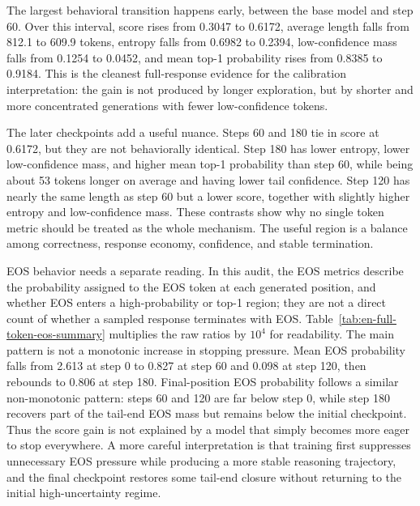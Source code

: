 The largest behavioral transition happens early, between the base model and step 60. Over this interval, score rises from 0.3047 to 0.6172, average length falls from 812.1 to 609.9 tokens, entropy falls from 0.6982 to 0.2394, low-confidence mass falls from 0.1254 to 0.0452, and mean top-1 probability rises from 0.8385 to 0.9184. This is the cleanest full-response evidence for the calibration interpretation: the gain is not produced by longer exploration, but by shorter and more concentrated generations with fewer low-confidence tokens.

The later checkpoints add a useful nuance. Steps 60 and 180 tie in score at 0.6172, but they are not behaviorally identical. Step 180 has lower entropy, lower low-confidence mass, and higher mean top-1 probability than step 60, while being about 53 tokens longer on average and having lower tail confidence. Step 120 has nearly the same length as step 60 but a lower score, together with slightly higher entropy and low-confidence mass. These contrasts show why no single token metric should be treated as the whole mechanism. The useful region is a balance among correctness, response economy, confidence, and stable termination.

EOS behavior needs a separate reading. In this audit, the EOS metrics describe the probability assigned to the EOS token at each generated position, and whether EOS enters a high-probability or top-1 region; they are not a direct count of whether a sampled response terminates with EOS. Table~\ref{tab:en-full-token-eos-summary} multiplies the raw ratios by $10^4$ for readability. The main pattern is not a monotonic increase in stopping pressure. Mean EOS probability falls from 2.613 at step 0 to 0.827 at step 60 and 0.098 at step 120, then rebounds to 0.806 at step 180. Final-position EOS probability follows a similar non-monotonic pattern: steps 60 and 120 are far below step 0, while step 180 recovers part of the tail-end EOS mass but remains below the initial checkpoint. Thus the score gain is not explained by a model that simply becomes more eager to stop everywhere. A more careful interpretation is that training first suppresses unnecessary EOS pressure while producing a more stable reasoning trajectory, and the final checkpoint restores some tail-end closure without returning to the initial high-uncertainty regime.

